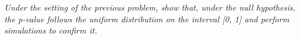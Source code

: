 \documentclass[11pt]{exam} %
\begin{document}
\begin{questions}
\titledquestion{} %
\textit{Under the setting of the previous problem, show that, under the null hypothesis, the p-value follows the uniform distribution on the interval [0, 1] and perform simulations to confirm it.}




\end{questions}

\listoftodos
\end{document}
